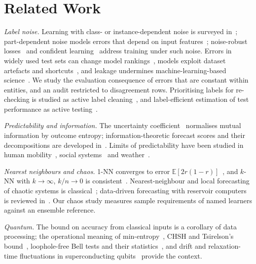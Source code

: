 \documentclass[journal]{IEEEtran}
\theoremstyle{definition}
\newcommand{\E}{\mathbb{E}}
\begin{document}
\section{Related Work}\label{sec:related}
\emph{Label noise.} Learning with class- or instance-dependent noise is surveyed in~\cite{frenay2014survey,song2023learning}; part-dependent noise models errors that depend on input features~\cite{xia2020part}; noise-robust losses~\cite{natarajan2013learning} and confident learning~\cite{northcutt2021confident} address training under such noise. Errors in widely used test sets can change model rankings~\cite{northcutt2021pervasive}, models exploit dataset artefacts and shortcuts~\cite{geirhos2020shortcut}, and leakage undermines machine-learning-based science~\cite{kapoor2023leakage}. We study the evaluation consequence of errors that are constant within entities, and an audit restricted to disagreement rows. Prioritising labels for re-checking is studied as active label cleaning~\cite{bernhardt2022active}, and label-efficient estimation of test performance as active testing~\cite{kossen2021active}.

\emph{Predictability and information.} The uncertainty coefficient~\cite{theil1970estimation} normalises mutual information by outcome entropy; information-theoretic forecast scores and their decompositions are developed in~\cite{roulston2002evaluating,weijs2010kl,gneiting2007strictly}. Limits of predictability have been studied in human mobility~\cite{song2010limits}, social systems~\cite{martin2016exploring,hofman2017prediction,salganik2020measuring} and weather~\cite{lorenz1969predictability,zhang2019predictability,bauer2015quiet}.

\emph{Nearest neighbours and chaos.} 1-NN converges to error $\E[2r(1-r)]$~\cite{cover1967nearest}, and $k$-NN with $k\to\infty$, $k/n\to0$ is consistent~\cite{stone1977consistent}. Nearest-neighbour and local forecasting of chaotic systems is classical~\cite{farmer1987predicting,casdagli1989nonlinear}; data-driven forecasting with reservoir computers is reviewed in~\cite{pathak2018model}. Our chaos study measures sample requirements of named learners against an ensemble reference.

\emph{Quantum.} The bound on accuracy from classical inputs is a corollary of data processing; the operational meaning of min-entropy~\cite{konig2009operational}, CHSH and Tsirelson's bound~\cite{clauser1969proposed,tsirelson1980quantum}, loophole-free Bell tests and their statistics~\cite{hensen2015loophole,hensen2016second,elkouss2016nearly}, and drift and relaxation-time fluctuations in superconducting qubits~\cite{klimov2018fluctuations,burnett2019decoherence,carroll2022dynamics,proctor2020detecting} provide the context.
\end{document}
